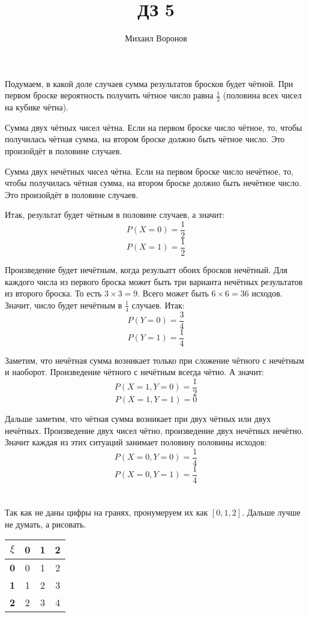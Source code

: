 \documentclass[a4paper,10pt]{article}
\title{ДЗ 5}
\author{Михаил Воронов}
\begin{document}
\maketitle

\section{}
Подумаем, в какой доле случаев сумма результатов бросков будет чётной.
При первом броске вероятность получить чётное число равна $\frac{1}{2}$
(половина всех чисел на кубике чётна).

Сумма двух чётных чисел чётна. Если на первом броске число чётное,
то, чтобы получилась чётная сумма, на втором броске должно быть
чётное число. Это произойдёт в половине случаев.

Сумма двух нечётных чисел чётна. Если на первом броске число нечётное,
то, чтобы получилась чётная сумма, на втором броске должно быть
нечётное число. Это произойдёт в половине случаев.

Итак, результат будет чётным в половине случаев, а значит:
$$ P(X=0) = \frac{1}{2} $$
$$ P(X=1) = \frac{1}{2} $$

Произведение будет нечётным, когда резульатт обоих бросков нечётный.
Для каждого числа из первого броска может быть три варианта нечётных
результатов из второго броска. То есть $3 \times 3 = 9$.
Всего может быть $6 \times 6 = 36$ исходов. Значит, число будет нечётным
в $\frac{1}{4}$ случаев. Итак:
$$ P(Y=0) = \frac{3}{4} $$
$$ P(Y=1) = \frac{1}{4} $$

Заметим, что нечётная сумма возникает только при сложение чётного с нечётным и наоборот.
Произведение чётного с нечётным всегда чётно. А значит:
$$ P(X=1, Y=0) = \frac{1}{2} $$
$$ P(X=1, Y=1) = 0 $$

Дальше заметим, что чётная сумма возникает при двух чётных или двух нечётных.
Произведение двух чисел чётно, произведение двух нечётных нечётно.
Значит каждая из этих ситуаций занимает половину половины исходов:
$$ P(X=0, Y=0) = \frac{1}{4} $$
$$ P(X=0, Y=1) = \frac{1}{4} $$

\section{}
Так как не даны цифры на гранях, пронумеруем их как $[0, 1, 2]$.
Дальше лучше не думать, а рисовать.

\begin{center}
\begin{tabular}{|c|c|c|c|}
\hline
$\xi$ & \textbf{0} & \textbf{1} & \textbf{2} \\
\hline
\textbf{0} & 0 & 1 & 2 \\
\hline
\textbf{1} & 1 & 2 & 3 \\
\hline
\textbf{2} & 2 & 3 & 4 \\
\hline
\end{tabular}
\end{center}
\end{document}
